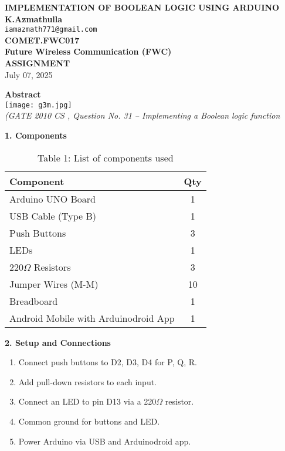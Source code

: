 \documentclass[12pt]{article}
\begin{document}
\begin{center}
    \textbf{\Large IMPLEMENTATION OF BOOLEAN LOGIC USING ARDUINO} \\
    \textbf{K.Azmathulla} \\
    \texttt{iamazmath771@gmail.com} \\
    \textbf{COMET.FWC017} \\
    \textbf{Future Wireless Communication (FWC)} \\
    \textbf{ASSIGNMENT} \\[5pt]
    July 07, 2025
\end{center}
\vspace{1em}

\begin{multicols}{2}

\noindent\textbf{Abstract} \\[0.5em]
\texttt{[image: g3m.jpg]} \\[0.5em]
\textit{(GATE 2010 CS , Question No. 31 – Implementing a Boolean logic function}

\vspace{1em}
\noindent\textbf{1. Components}
\begin{table}[H]
\small
\centering
\begin{tabular}{|p{4.2cm}|c|}
\hline
\textbf{Component} & \textbf{Qty} \\
\hline
Arduino UNO Board & 1 \\
USB Cable (Type B) & 1 \\
Push Buttons & 3 \\
LEDs & 1 \\
220$\Omega$ Resistors & 3 \\
Jumper Wires (M-M) & 10 \\
Breadboard & 1 \\
Android Mobile with Arduinodroid App & 1 \\
\hline
\end{tabular}
\caption*{Table 1: List of components used}
\end{table}

\vspace{1em}
\noindent\textbf{2. Setup and Connections}
\begin{enumerate}
    \item Connect push buttons to D2, D3, D4 for P, Q, R.
    \item Add pull-down resistors to each input.
    \item Connect an LED to pin D13 via a 220$\Omega$ resistor.
    \item Common ground for buttons and LED.
    \item Power Arduino via USB and Arduinodroid app.
\end{enumerate}


\end{multicols}
\end{document}
